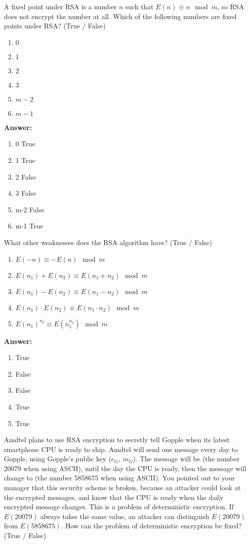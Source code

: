 \documentclass[12pt,twoside]{article}
\newcommand{\answer}{
 \par\medskip
 \textbf{Answer:}
}
\newcommand{\answerIId}{ \answer
\begin{enumerate}
	\item 0 True
	\item 1 True
	\item 2 False
	\item 3 False
	\item m-2 False
	\item m-1 True
\end{enumerate}
}
\newcommand{\answerIIe}{ \answer
\begin{enumerate}
	\item True
	\item False
	\item False
	\item True
	\item True

\end{enumerate}
}
\begin{document}
\begin{problems}
\begin {problemparts}
\problempart {} A fixed point under RSA is a number $n$ such that $E(n)
\equiv n \mod m$, so RSA does not encrypt the number at all. Which of the
following numbers are fixed points under RSA? (True / False)
\begin{enumerate}
  \item $0$
  \item $1$
  \item $2$
  \item $3$
  \item $m - 2$
  \item $m - 1$
\end{enumerate}
\answerIId
  
\problempart {} What other weaknesses does the RSA algorithm have?
(True / False)
\begin{enumerate}
  \item $E(-n) \equiv -E(n) \mod m$
  \item $E(n_1) + E(n_2) \equiv E(n_1 + n_2) \mod m$
  \item $E(n_1) - E(n_2) \equiv E(n_1 - n_2) \mod m$
  \item $E(n_1) \cdot E(n_2) \equiv E(n_1 \cdot n_2) \mod m$
  \item $E(n_1)^{n_2} \equiv E(n_1 ^ {n_2}) \mod m$
\end{enumerate}
\answerIIe

\problempart {} Amdtel plans to use RSA encryption to secretly tell
Gopple when its latest smartphone CPU is ready to ship. Amdtel will send one
message every day to Gopple, using Gopple's public key ($e_G$, $m_G$). The
message will be  (the number 20079 when using ASCII), until the day
the CPU is ready, then the message will change to  (the number
5858675 when using ASCII). You pointed out to your manager that this security
scheme is broken, because an attacker could look at the encrypted messages, and
know that the CPU is ready when the daily encrypted message changes. This is a
problem of deterministic encryption. If $E(20079)$ always takes the same value,
an attacker can distinguish $E(20079)$ from $E(5858675)$. How can the problem of
deterministic encryption be fixed? (True / False)


\end{problemparts}
\end{problems}
\end{document}
